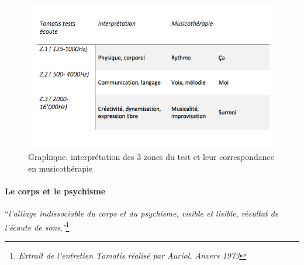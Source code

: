 \begin{figure}
	\centering
	\includegraphics[width=0.7\linewidth]{images/testinterpmusico}
	\caption[ L'interprétation des 3 zones et leur correspondance
        en musicothérapie]{Graphique. interprétation des 3 zones du
          test et leur correspondance en musicothérapie}
       
	\label{graphiquecolonnetestmusico}
      \end{figure}


\paragraph{Le corps et le psychisme}

``\emph{l'alliage indissociable du corps et du psychisme, 
visible et lisible, résultat de l'écoute de sons.''}\footnote{\emph{Extrait de l'entretien Tomatis réalisé par Auriol, Anvers 1973}}










      


  
 	
 	
 	
 
       
   
 





      



 











   
 

  

  
  


